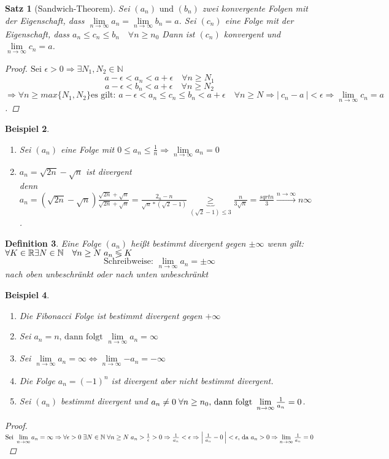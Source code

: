 \documentclass[a4paper,titlepage,oneside]{article}
\def\N{\ensuremath{\mathbb{N}} }
\def\R{\ensuremath{\mathbb{R}} }
\def\sp{\hspace{0,1cm}}
\renewcommand{\liminf}[2][n]{\ensuremath{\lim\limits_{#1 \rightarrow \infty}{#2}}}
\newcommand{\abs}[1]{\ensuremath{\left|\:#1\:\right|}}
\newcommand{\longtoinf}[1][n]{\ensuremath{\overset{\scriptscriptstyle{#1 \to \infty}}{\longrightarrow}}}
\theoremstyle{thmstyle}
\newtheorem{satz}{Satz}[subsection]
\newtheorem{defi}[satz]{Definition}
\newtheorem{bsp}[satz]{Beispiel}
\begin{document}
\begin{satz}[Sandwich-Theorem]
Sei \((a_n)\text{ und }(b_n)\) zwei konvergente Folgen mit der Eigenschaft, dass \(\liminf{a_n} = \liminf{b_n} = a\).
Sei \((c_n)\) eine Folge mit der Eigenschaft, dass \(a_n \le c_n \le b_n \quad \forall n \ge n_0\)
Dann ist \((c_n)\) konvergent und \(\liminf{c_n} = a\).
\begin{proof}
\(\text{Sei }\epsilon > 0 \Rightarrow \exists  N_1, N_2 \in \N\)
\[a - \epsilon < a_n < a + \epsilon \quad \forall n \ge N_1\]
\[a - \epsilon < b_n < a + \epsilon \quad \forall n \ge N_2\]
\(\Rightarrow \forall n \ge max\{N_1, N_2\} 
\text{es gilt: } a-\epsilon < a_n \le c_n \le b_n < a + \epsilon \quad  \forall n \ge N
\Rightarrow \abs{c_n - a} < \epsilon \Rightarrow \liminf{c_n} = a\).
\end{proof}
\end{satz}

\begin{bsp}
\begin{enumerate}
\item Sei \((a_n)\) eine Folge mit \(0 \le a_n \le \frac{1}{n} \Rightarrow \liminf{a_n} = 0\)
\item \(a_n = \sqrt{2n} - \sqrt{n}\) ist divergent\\
denn \(a_n = \left(\sqrt{2n} - \sqrt{n}\right)\frac{\sqrt{2n} + \sqrt{n}}{\sqrt{2n} + \sqrt{n}} = \frac{2_n - n}{\sqrt{n}*\left(\sqrt{2} - 1\right)} \underbrace{\ge}_{\left(\sqrt{2} - 1\right)\le 3} \frac{n}{3\sqrt{n}} = \frac{sqrt{n}}{3} \longtoinf{n} \infty\).
\end{enumerate}
\end{bsp}

\begin{defi}
Eine Folge \((a_n)\) heißt bestimmt divergent gegen \(\pm \infty \) wenn gilt: \(\forall K \in \R \exists N \in \N \quad \forall n \ge N \sp a_n \lessgtr K \)
\[\text{Schreibweise: }\liminf{a_n} = \pm \infty \]
nach oben unbeschränkt oder nach unten unbeschränkt
\end{defi}

\begin{bsp}
\begin{enumerate}
\item Die Fibonacci Folge ist bestimmt divergent gegen \(+ \infty\)
\item Sei \(a_n = n\text{, dann folgt }\liminf{a_n} = \infty\)
\item Sei \(\liminf{a_n} = \infty \Leftrightarrow \liminf{-a_n} = - \infty\)
\item Die Folge \(a_n = (-1)^n\) ist divergent aber nicht bestimmt divergent.
\item Sei \((a_n)\) bestimmt divergent und \(a_n \ne 0 \sp \forall n \ge n_0\text{, dann folgt }\liminf{\frac{1}{a_n}} = 0\).
\end{enumerate}
\begin{proof}
\(\text{Sei } \liminf{a_n} = \infty \Rightarrow \forall \epsilon > 0 \sp \exists N \in \N \sp \forall n \ge N \sp a_n > \frac{1}{\epsilon} > 0 \Rightarrow \frac{1}{a_n} < \epsilon \Rightarrow \abs{\frac{1}{a_n} - 0} < \epsilon \text{, da } a_n > 0 \Rightarrow \liminf{\frac{1}{a_n}} = 0\)
\end{proof}
\end{bsp}
\end{document}
